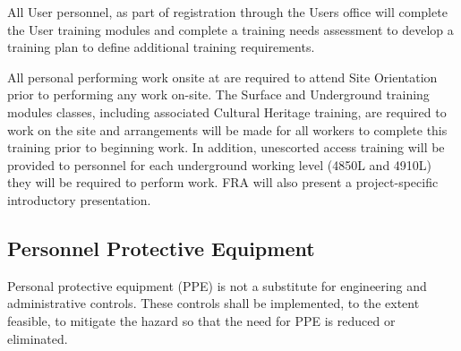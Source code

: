 All User personnel, as part of registration through the Users office
will complete the User  training modules and complete a
training needs assessment to develop a training plan to define
additional  training requirements.

All personal performing work onsite at \surf are required to attend
\surf {} Site Orientation prior to performing any work
on-site.  The \surf Surface and Underground training modules classes,
including associated Cultural Heritage training, are required to work
on the site and arrangements will be made for all workers to complete
this training prior to beginning work. In addition, unescorted access
training will be provided to personnel for each underground working
level (4850L and 4910L) they will be required to perform work.  FRA
will also present a project-specific introductory 
presentation. 

\subsection{Personnel Protective Equipment}

Personal protective equipment (PPE) is not a substitute for
engineering and administrative controls. These controls shall be
implemented, to the extent feasible, to mitigate the hazard so that
the need for PPE is reduced or eliminated.

